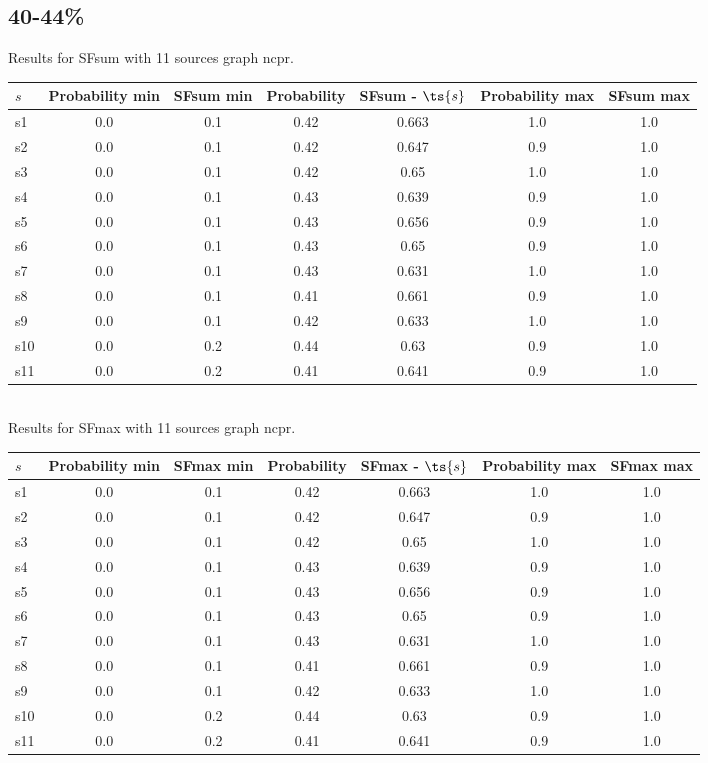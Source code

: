 \documentclass{article}
\begin{document}
\newpage

\subsection{40-44\%}

\noindent Results for SFsum with 11 sources graph ncpr.

\noindent\begin{tabular}{|l|c|c|c|c|c|c|}
\hline
$s$& Probability min & SFsum min & Probability & SFsum - $\ts{s}$ & Probability max & SFsum max\\
\hline
s1 &0.0 & 0.1 & 0.42 & 0.663 & 1.0 & 1.0\\
\hline
s2 &0.0 & 0.1 & 0.42 & 0.647 & 0.9 & 1.0\\
\hline
s3 &0.0 & 0.1 & 0.42 & 0.65 & 1.0 & 1.0\\
\hline
s4 &0.0 & 0.1 & 0.43 & 0.639 & 0.9 & 1.0\\
\hline
s5 &0.0 & 0.1 & 0.43 & 0.656 & 0.9 & 1.0\\
\hline
s6 &0.0 & 0.1 & 0.43 & 0.65 & 0.9 & 1.0\\
\hline
s7 &0.0 & 0.1 & 0.43 & 0.631 & 1.0 & 1.0\\
\hline
s8 &0.0 & 0.1 & 0.41 & 0.661 & 0.9 & 1.0\\
\hline
s9 &0.0 & 0.1 & 0.42 & 0.633 & 1.0 & 1.0\\
\hline
s10 &0.0 & 0.2 & 0.44 & 0.63 & 0.9 & 1.0\\
\hline
s11 &0.0 & 0.2 & 0.41 & 0.641 & 0.9 & 1.0\\
\hline
\end{tabular}\\

\noindent Results for SFmax with 11 sources graph ncpr.

\noindent\begin{tabular}{|l|c|c|c|c|c|c|}
\hline
$s$& Probability min & SFmax min & Probability & SFmax - $\ts{s}$ & Probability max & SFmax max\\
\hline
s1 &0.0 & 0.1 & 0.42 & 0.663 & 1.0 & 1.0\\
\hline
s2 &0.0 & 0.1 & 0.42 & 0.647 & 0.9 & 1.0\\
\hline
s3 &0.0 & 0.1 & 0.42 & 0.65 & 1.0 & 1.0\\
\hline
s4 &0.0 & 0.1 & 0.43 & 0.639 & 0.9 & 1.0\\
\hline
s5 &0.0 & 0.1 & 0.43 & 0.656 & 0.9 & 1.0\\
\hline
s6 &0.0 & 0.1 & 0.43 & 0.65 & 0.9 & 1.0\\
\hline
s7 &0.0 & 0.1 & 0.43 & 0.631 & 1.0 & 1.0\\
\hline
s8 &0.0 & 0.1 & 0.41 & 0.661 & 0.9 & 1.0\\
\hline
s9 &0.0 & 0.1 & 0.42 & 0.633 & 1.0 & 1.0\\
\hline
s10 &0.0 & 0.2 & 0.44 & 0.63 & 0.9 & 1.0\\
\hline
s11 &0.0 & 0.2 & 0.41 & 0.641 & 0.9 & 1.0\\
\hline
\end{tabular}\\
\end{document}
